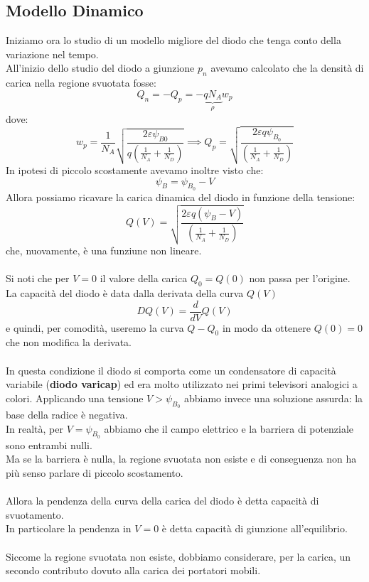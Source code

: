 \documentclass{article}
\numberwithin{equation}{subsection}
\begin{document}
	\subsection{Modello Dinamico}
	Iniziamo ora lo studio di un modello migliore del diodo che tenga conto della variazione nel tempo. \\
	All’inizio dello studio del diodo a giunzione $p_n$ avevamo calcolato che la densità di carica nella regione svuotata fosse:
	$$Q_n = -Q_p = -\underbrace{qN_A}_{\rho} w_p$$
	dove:
	$$w_p = \frac{1}{N_A} \sqrt{\frac{2\varepsilon\psi_{B0}}{q\left(\frac{1}{N_A} + \frac{1}{N_D}\right)}} \implies Q_p = \sqrt{\frac{2\varepsilon q\psi_{B_0}}{\left(\frac{1}{N_A} + \frac{1}{N_D}\right)}}$$
	In ipotesi di piccolo scostamente avevamo inoltre visto che:
	$$\psi_B = \psi_{B_0} - V$$
	Allora possiamo ricavare la carica dinamica del diodo in funzione della tensione:
	$$Q(V) = \sqrt{\frac{2\varepsilon q(\psi_B - V)}{\left(\frac{1}{N_A} + \frac{1}{N_D}\right)}}$$
	che, nuovamente, è una funziune non lineare.\\\\
	Si noti che per $V = 0$ il valore della carica $Q_0 = Q(0)$ non passa per l’origine. \\
	La capacità del diodo è data dalla derivata della curva $Q(V)$
	$$DQ(V) = \frac{d}{dV}Q(V)$$
	e quindi, per comodità, useremo la curva $Q - Q_0$ in modo da ottenere $Q(0) = 0$ che non modifica la derivata.\\\\
	In questa condizione il diodo si comporta come un condensatore di capacità variabile (\textbf{diodo varicap}) ed era molto utilizzato nei primi televisori analogici a colori.
	Applicando una tensione $V > \psi_{B_0}$ abbiamo invece una soluzione assurda: la base della radice è negativa. \\
	In realtà, per $V = \psi_{B_0}$ abbiamo che il campo elettrico e la barriera di potenziale sono entrambi nulli. \\
	Ma se la barriera è nulla, la regione svuotata non esiste e di conseguenza non ha più senso parlare di piccolo scostamento.\\\\
	Allora la pendenza della curva della carica del diodo è detta capacità di svuotamento. \\
	In particolare la pendenza in $V = 0$ è detta capacità di giunzione all’equilibrio.\\\\
	Siccome la regione svuotata non esiste, dobbiamo considerare, per la carica, un secondo contributo dovuto alla carica dei portatori mobili. \\
\end{document}
